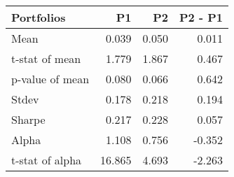 \begin{tabular}{lrrr}
\toprule
Portfolios & P1 & P2 & P2 - P1 \\
\midrule
Mean & 0.039 & 0.050 & 0.011 \\
t-stat of mean & 1.779 & 1.867 & 0.467 \\
p-value of mean & 0.080 & 0.066 & 0.642 \\
Stdev & 0.178 & 0.218 & 0.194 \\
Sharpe & 0.217 & 0.228 & 0.057 \\
Alpha & 1.108 & 0.756 & -0.352 \\
t-stat of alpha & 16.865 & 4.693 & -2.263 \\
\bottomrule
\end{tabular}
